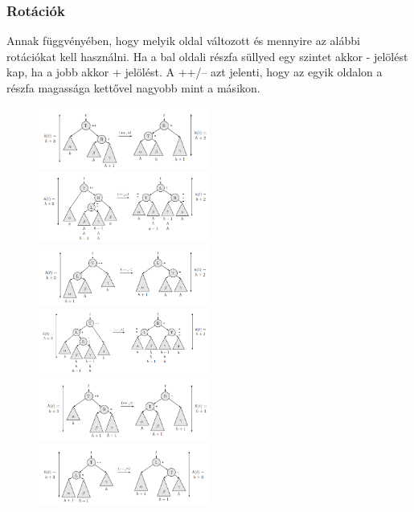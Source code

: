 \documentclass[margin=0px]{article}
\begin{document}
\subsubsection{Rotációk}
Annak függvényében, hogy melyik oldal változott és mennyire az alábbi rotációkat kell használni.
Ha a bal oldali részfa süllyed egy szintet akkor - jelölést kap, ha a jobb akkor + jelölést.
A ++/-- azt jelenti, hogy az egyik oldalon a részfa magassága kettővel nagyobb mint a másikon.
\begin{figure}[H]
    \centering
    \includegraphics[width=0.5\textwidth]{img/ppp_rotation.png}
    \includegraphics[width=0.5\textwidth]{img/ppm_rotation.png}
    \includegraphics[width=0.5\textwidth]{img/mmm_rotation.png}
    \includegraphics[width=0.5\textwidth]{img/mmp_rotation.png}
    \includegraphics[width=0.5\textwidth]{img/ppn_rotation.png}
    \includegraphics[width=0.5\textwidth]{img/mmn_roatation.png}
\end{figure}
\end{document}
